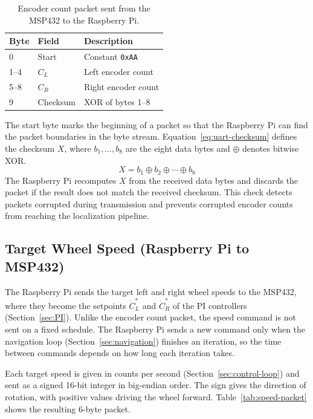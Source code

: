 \begin{table}[htbp]
  \centering
  \caption{Encoder count packet sent from the MSP432 to the Raspberry Pi.}
  \label{tab:slot-count-packet}
  \small
  \begin{tabular}{l l l}
    \hline
    Byte & Field & Description \\
    \hline
    0     & Start    & Constant \texttt{0xAA} \\
    1--4  & $C_L$    & Left encoder count \\
    5--8  & $C_R$    & Right encoder count \\
    9     & Checksum & XOR of bytes 1--8 \\
    \hline
  \end{tabular}
\end{table}

The start byte marks the beginning of a packet so that the Raspberry Pi can find
the packet boundaries in the byte stream. Equation~\ref{eq:uart-checksum} defines the
checksum $X$, where $b_1, \dots, b_8$ are the eight data bytes and $\oplus$ denotes
bitwise XOR.
\begin{equation}
  X = b_1 \oplus b_2 \oplus \cdots \oplus b_8
  \label{eq:uart-checksum}
\end{equation}
The Raspberry Pi recomputes $X$ from the received data bytes and discards the packet if
the result does not match the received checksum. This check detects packets corrupted
during transmission and prevents corrupted encoder counts from reaching the localization
pipeline.

\subsection{Target Wheel Speed (Raspberry Pi to MSP432)}
\label{sec:uart-speed}

The Raspberry Pi sends the target left and right wheel speeds to the MSP432, where they
become the setpoints $\dot{C}^*_L$ and $\dot{C}^*_R$ of the PI controllers
(Section~\ref{sec:PI}). Unlike the encoder count packet, the speed command is not sent on a
fixed schedule. The Raspberry Pi sends a new command only when the navigation loop
(Section~\ref{sec:navigation}) finishes an iteration, so the time between commands depends
on how long each iteration takes.

Each target speed is given in counts per second (Section~\ref{sec:control-loop}) and sent as
a signed 16-bit integer in big-endian order. The sign gives the direction of rotation, with
positive values driving the wheel forward. Table~\ref{tab:speed-packet} shows the resulting
6-byte packet.

